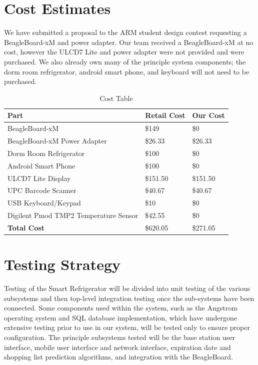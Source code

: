 \documentclass[11pt]{article} %
\begin{document}
\section{Cost Estimates}
We have submitted a proposal to the ARM student design contest requesting a BeagleBoard-xM and power adapter. Our team received a BeagleBoard-xM at no cost, however the ULCD7 Lite and power adapter were not provided and were purchased. We also already own many of the principle system components; the dorm room refrigerator, android smart phone, and keyboard will not need to be purchased.
\begin{table}[h!]
\vspace{0.5cm}
\begin{center}
\caption{Cost Table}
\label{tab:cost}
\begin{tabular}{| p{3.0in} | p{1.5in} |p{1.5in} |}
\hline
Part & Retail Cost & Our Cost \\
\hline
BeagleBoard-xM & \$149 & \$0 \\
\hline
BeagleBoard-xM Power Adapter & \$26.33 & \$26.33 \\
\hline
Dorm Room Refrigerator & \$100 & \$0 \\
\hline
Android Smart Phone & \$100 & \$0  \\
\hline
ULCD7 Lite Display & \$151.50  & \$151.50 \\
\hline
UPC Barcode Scanner & \$40.67 & \$40.67 \\
\hline
USB Keyboard/Keypad & \$10 & \$0 \\
\hline
Digilent Pmod TMP2 Temperature Sensor & \$42.55 & \$0 \\
\hline
\hline
\textbf{Total Cost} & \$620.05 & \$271.05 \\
\hline
\end{tabular}
\end{center}
\end{table}

\section{Testing Strategy}
Testing of the Smart Refrigerator will be divided into unit testing of the various subsystems and then top-level integration testing once the sub-systems have been connected. Some components used within the system, such as the Angstrom operating system and SQL database implementation, which have undergone extensive testing prior to use in our system, will be tested only to ensure proper configuration. The principle subsystems tested will be the base station user interface, mobile user interface and network interface, expiration date and shopping list prediction algorithms, and integration with the BeagleBoard.
\end{document}
